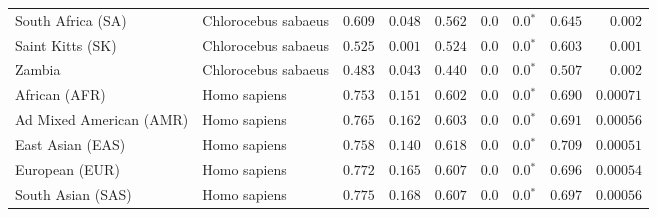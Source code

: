 \begin{center}
\begin{adjustbox}{width = 1\textwidth}
\begin{tabular}{|l|l|r|r|r|r|r|r|r|}
              South Africa (SA) &  Chlorocebus sabaeus &                                        $ 0.609$ &                                           $ 0.048$ &                      $ 0.562$ &            $0.0$ &                  $\bm{0.0{^*}}$ &                                           $ 0.645$ &           $ 0.002$ \\
               Saint Kitts (SK) &  Chlorocebus sabaeus &                                        $ 0.525$ &                                           $ 0.001$ &                      $ 0.524$ &            $0.0$ &                  $\bm{0.0{^*}}$ &                                           $ 0.603$ &           $ 0.001$ \\
                         Zambia &  Chlorocebus sabaeus &                                        $ 0.483$ &                                           $ 0.043$ &                      $ 0.440$ &            $0.0$ &                  $\bm{0.0{^*}}$ &                                           $ 0.507$ &           $ 0.002$ \\
                  African (AFR) &         Homo sapiens &                                        $ 0.753$ &                                           $ 0.151$ &                      $ 0.602$ &            $0.0$ &                  $\bm{0.0{^*}}$ &                                           $ 0.690$ &          $0.00071$ \\
        Ad Mixed American (AMR) &         Homo sapiens &                                        $ 0.765$ &                                           $ 0.162$ &                      $ 0.603$ &            $0.0$ &                  $\bm{0.0{^*}}$ &                                           $ 0.691$ &          $0.00056$ \\
               East Asian (EAS) &         Homo sapiens &                                        $ 0.758$ &                                           $ 0.140$ &                      $ 0.618$ &            $0.0$ &                  $\bm{0.0{^*}}$ &                                           $ 0.709$ &          $0.00051$ \\
                 European (EUR) &         Homo sapiens &                                        $ 0.772$ &                                           $ 0.165$ &                      $ 0.607$ &            $0.0$ &                  $\bm{0.0{^*}}$ &                                           $ 0.696$ &          $0.00054$ \\
              South Asian (SAS) &         Homo sapiens &                                        $ 0.775$ &                                           $ 0.168$ &                      $ 0.607$ &            $0.0$ &                  $\bm{0.0{^*}}$ &                                           $ 0.697$ &          $0.00056$ \\
\bottomrule
\end{tabular}
\end{adjustbox}
\newpage
\newpage
\end{center}